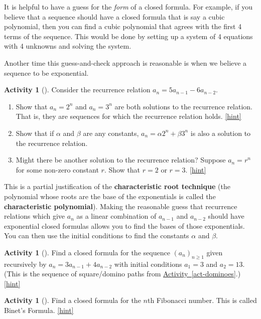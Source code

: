 \documentclass[10pt,]{book}
\newcommand{\terminology}[1]{\textbf{#1}}
\theoremstyle{plain}
\theoremstyle{definition}
\theoremstyle{definition}
\theoremstyle{definition}
\newtheorem{activity}[project]{Activity}
\numberwithin{equation}{chapter}
\begin{document}
\hypertarget{p-944}{}%
It is helpful to have a guess for the \emph{form} of a closed formula.  For example, if you believe that a sequence should have a closed formula that is say a cubic polynomial, then you can find a cubic polynomial that agrees with the first 4 terms of the sequence.  This would be done by setting up a system of 4 equations with 4 unknowns and solving the system.%
\par
\hypertarget{p-945}{}%
Another time this guess-and-check approach is reasonable is when we believe a sequence to be exponential.%
\begin{activity}[]\label{activity-141}
\hypertarget{p-946}{}%
Consider the recurrence relation \(a_n = 5a_{n-1} - 6a_{n-2}\).%
\begin{enumerate}[font=\bfseries,label=(\alph*),ref=\alph*]
\item\label{task-180} \hypertarget{p-947}{}%
Show that \(a_n = 2^n\) and \(a_n = 3^n\) are both solutions to the recurrence relation.  That is, they are sequences for which the recurrence relation holds.%
\hfill{\tiny\hyperlink{a-148.a}{[hint]}\hypertarget{q-148.a}{}}\item\label{task-181} \hypertarget{p-949}{}%
Show that if \(\alpha\) and \(\beta\) are any constants, \(a_n = \alpha 2^n + \beta 3^n\) is also a solution to the recurrence relation.%
\item\label{task-182} \hypertarget{p-950}{}%
Might there be another solution to the recurrence relation?  Suppose \(a_n = r^n\) for some non-zero constant \(r\).  Show that \(r = 2\) or \(r = 3\).%
\hfill{\tiny\hyperlink{a-148.c}{[hint]}\hypertarget{q-148.c}{}}\end{enumerate}
\end{activity}
\hypertarget{p-952}{}%
This is a partial justification of the \terminology{characteristic root technique} (the polynomial whose roots are the base of the exponentials is called the \terminology{characteristic polynomial}).  Making the reasonable guess that recurrence relations which give \(a_n\) as a linear combination of \(a_{n-1}\) and \(a_{n-2}\) should have exponential closed formulas allows you to find the bases of those exponentials.  You can then use the initial conditions to find the constants \(\alpha\) and \(\beta\).%
\begin{activity}[]\label{activity-142}
\hypertarget{p-953}{}%
Find a closed formula for the sequence \((a_n)_{n \ge 1}\) given recursively by \(a_n = 3a_{n-1} + 4a_{n-2}\) with initial conditions \(a_1 = 3\) and \(a_2 = 13\).  (This is the sequence of square/domino paths from \hyperref[act-dominoes]{Activity~\ref{act-dominoes}}.)%
\hfill{\tiny\hyperlink{a-149}{[hint]}\hypertarget{q-149}{}}\end{activity}
\begin{activity}[]\label{act-binet}
\hypertarget{p-955}{}%
Find a closed formula for the \(n\)th Fibonacci number.  This is called Binet's Formula.%
\hfill{\tiny\hyperlink{a-150}{[hint]}\hypertarget{q-150}{}}\end{activity}
\typeout{************************************************}
\typeout{************************************************}
\end{document}
